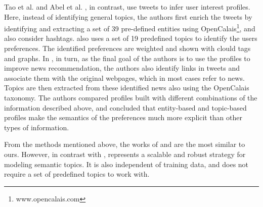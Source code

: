 Tao et al. \cite{tao:2011} and Abel et al. \cite{abel2011semantic}, in
contrast, use tweets to infer user interest profiles. Here, instead of
identifying general topics, the authors first enrich the tweets by identifying
and extracting a set of 39 pre-defined entities using
OpenCalais\footnote{www.opencalais.com}, and also consider hashtags.
\cite{tao:2011} also uses a set of 19 predefined topics to identify the users
preferences. The identified preferences are weighted and shown with clould tags
and graphs. In \cite{abel2011semantic}, in turn, as the final goal of the
authors is to use the profiles to improve news recommendation, the authors also
identify links in tweets and associate them with the original webpages, which in
most cases refer to news. Topics are then extracted from these identified news
also using the OpenCalais taxonomy. The authors compared profiles built with
different combinations of the information described above, and concluded that
entity-based and topic-based profiles make the semantics of the preferences
much more explicit than other types of information.

From the methods mentioned above, the works of \cite{kuhn2007semantic} and \cite{pennacchiotti2011democrats} are the most similar to ours.
However, in contrast with \cite{kuhn2007semantic}, \method represents a scalable and robust strategy for modeling semantic topics. It is also independent of training data, and does not require a set of predefined topics to work with.




